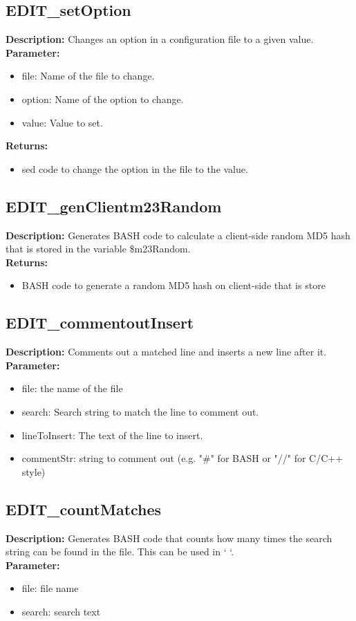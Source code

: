 \subsection{EDIT\_setOption}
\textbf{Description:} Changes an option in a configuration file to a given value.\\
\textbf{Parameter:}
\begin{itemize}
\item file: Name of the file to change.
\item option: Name of the option to change.
\item value: Value to set.
\end{itemize}
\textbf{Returns:}
\begin{itemize}
\item sed code to change the option in the file to the value.
\end{itemize}

\subsection{EDIT\_genClientm23Random}
\textbf{Description:} Generates BASH code to calculate a client-side random MD5 hash that is stored in the variable \$m23Random.\\
\textbf{Returns:}
\begin{itemize}
\item BASH code to generate a random MD5 hash on client-side that is store
\end{itemize}

\subsection{EDIT\_commentoutInsert}
\textbf{Description:} Comments out a matched line and inserts a new line after it.\\
\textbf{Parameter:}
\begin{itemize}
\item file: the name of the file
\item search: Search string to match the line to comment out.
\item lineToInsert: The text of the line to insert.
\item commentStr: string to comment out (e.g. "\#" for BASH or "//" for C/C++ style)
\end{itemize}

\subsection{EDIT\_countMatches}
\textbf{Description:} Generates BASH code that counts how many times the search string can be found in the file. This can be used in ` `.\\
\textbf{Parameter:}
\begin{itemize}
\item file: file name
\item search: search text
\end{itemize}

